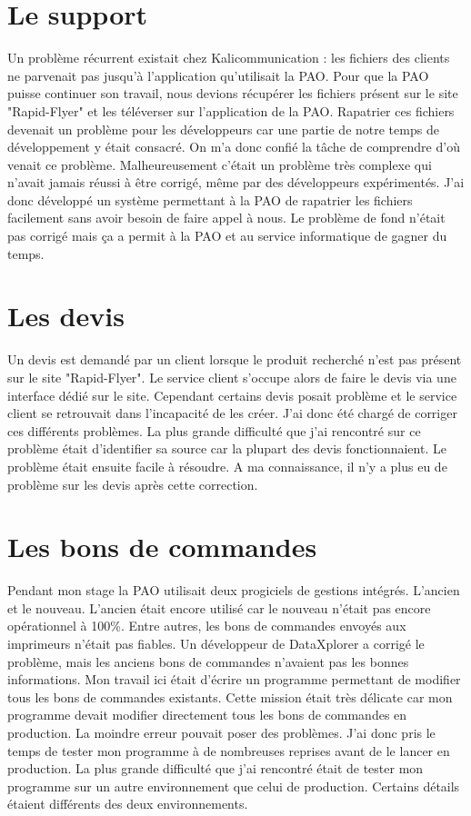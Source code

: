 
\section{Le support}
Un problème récurrent existait chez Kalicommunication : les fichiers des clients ne parvenait pas jusqu'à l'application qu'utilisait la PAO. Pour que la PAO puisse continuer son travail, nous devions récupérer les fichiers présent sur le site "Rapid-Flyer" et les téléverser sur l'application de la PAO.\newline
Rapatrier ces fichiers devenait un problème pour les développeurs car une partie de notre temps de développement y était consacré.\newline
On m'a donc confié la tâche de comprendre d'où venait ce problème. Malheureusement c'était un problème très complexe qui n'avait jamais réussi à être corrigé, même par des développeurs expérimentés. J'ai donc développé un système permettant à la PAO de rapatrier les fichiers facilement sans avoir besoin de faire appel à nous. Le problème de fond n'était pas corrigé mais ça a permit à la PAO et au service informatique de gagner du temps.

\section{Les devis}
Un devis est demandé par un client lorsque le produit recherché n'est pas présent sur le site "Rapid-Flyer". Le service client s'occupe alors de faire le devis via une interface dédié sur le site. Cependant certains devis posait problème et le service client se retrouvait dans l'incapacité de les créer.\newline
J'ai donc été chargé de corriger ces différents problèmes. La plus grande difficulté que j'ai rencontré sur ce problème était d'identifier sa source car la plupart des devis fonctionnaient. Le problème était ensuite facile à résoudre. A ma connaissance, il n'y a plus eu de problème sur les devis après cette correction.

\section{Les bons de commandes}
Pendant mon stage la PAO utilisait deux progiciels de gestions intégrés. L'ancien et le nouveau. L'ancien était encore utilisé car le nouveau n'était pas encore opérationnel à 100\%. Entre autres, les bons de commandes envoyés aux imprimeurs n'était pas fiables. Un développeur de DataXplorer a corrigé le problème, mais les anciens bons de commandes n'avaient pas les bonnes informations. Mon travail ici était d'écrire un programme permettant de modifier tous les bons de commandes existants. Cette mission était très délicate car mon programme devait modifier directement tous les bons de commandes en production. La moindre erreur pouvait poser des problèmes. J'ai donc pris le temps de tester mon programme à de nombreuses reprises avant de le lancer en production. La plus grande difficulté que j'ai rencontré était de tester mon programme sur un autre environnement que celui de production. Certains détails étaient différents des deux environnements.